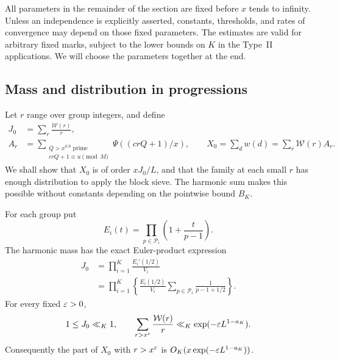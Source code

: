 All parameters in the remainder of the section are fixed before
\(x\) tends to infinity.  Unless an independence is explicitly
asserted, constants, thresholds, and rates of convergence may depend
on those fixed parameters.  The estimates are valid for arbitrary
fixed marks, subject to the lower bounds on \(K\) in the Type~II
applications.  We will choose the parameters together at the end.

\subsection{Mass and distribution in progressions}

Let \(r\) range over group integers, and define
\begin{equation}\label{con:mass-definitions}
 \begin{split}
 J_0&=\sum_r\frac{\mathcal W(r)}r,\\
 A_r&=\sum_{\substack{Q>x^{0.9}\text{ prime}\\crQ+1\equiv u\pmod M}}
                         \Psi((crQ+1)/x),\qquad
 X_0=\sum_d w(d)=\sum_r\mathcal W(r)A_r.
 \end{split}
\end{equation}
We shall show that \(X_0\) is of order \(xJ_0/L\), and that the
family at each small \(r\) has enough distribution to apply the
block sieve.  The harmonic sum makes this possible without constants
depending on the pointwise bound \(B_K\).

\begin{lemma}\label{con:harmonic}
For each group put
\[
 E_i(t)=\prod_{p\in\mathcal P_i}\left(1+\frac{t}{p-1}\right).
\]
The harmonic mass has the exact Euler-product expression
\begin{equation}\label{con:harmonic-identity}
 \begin{aligned}
 J_0&=\prod_{i=1}^K\frac{E_i'(1/2)}{V_i}\\
    &=\prod_{i=1}^K\left\{
       \frac{E_i(1/2)}{V_i}
       \sum_{p\in\mathcal P_i}\frac1{p-1+1/2}\right\}.
 \end{aligned}
\end{equation}
For every fixed \(\varepsilon>0\),
\begin{equation}\label{con:harmonic-bounds}
 1\le J_0\ll_K1,\qquad
 \sum_{r>x^\varepsilon}\frac{\mathcal W(r)}r
       \ll_K\exp(-\varepsilon L^{1-a_K}).
\end{equation}
Consequently the part of \(X_0\) with \(r>x^\varepsilon\) is
\(O_K(x\exp(-\varepsilon L^{1-a_K}))\).
\end{lemma}

